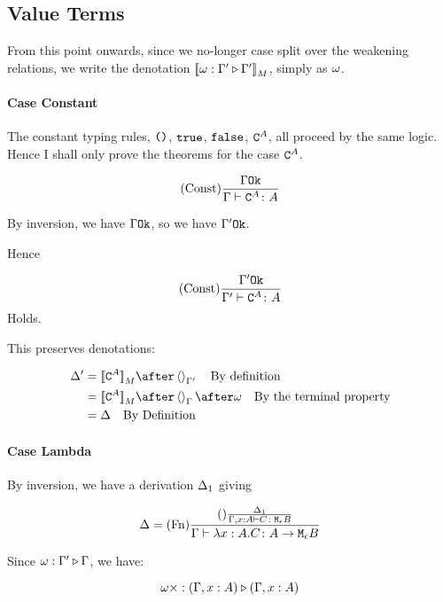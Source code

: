 \documentclass{report}
\begin{document}
    \subsection{Value Terms}
    From this point onwards, since we no-longer case split over the weakening relations, we write the denotation ${\bf [\![}\omega : \Gamma' \triangleright \Gamma'{\bf ]\!]}_M$, simply as $\omega$.


    \paragraph{Case Constant}
    The constant typing rules, $\texttt{()}$, $\texttt{true}$, $\texttt{false}$, $\texttt{C}^{A}$, all proceed by the same logic. Hence I shall only prove the theorems for the case $\texttt{C}^{A}$.

    \begin{equation}
        (\text{Const}) \frac{\Gamma \texttt{Ok}}{\Gamma \vdash \texttt{C}^{A} \colon A}
    \end{equation}

    By inversion, we have $\Gamma \texttt{Ok}$, so we have $\Gamma' \texttt{Ok}$.

    Hence

    \begin{equation}
        (\text{Const}) \frac{\Gamma' \texttt{Ok}}{\Gamma' \vdash \texttt{C}^{A} \colon A}
    \end{equation}
    Holds.

    This preserves denotations:


    \begin{align}
        \D' & = \deno{\const{A}} \after \term{\G'}\qt{By definition}\\
        & = \deno{\const{A}} \after \term{\G}\after \w \qt{By the terminal property}\\
        & = \D\qt{By Definition}\\
    \end{align}


    \paragraph{Case Lambda}
    By inversion, we have a derivation $\Delta_1$ giving

    \begin{equation}
        \Delta = (\text{Fn}) \frac{
            (\text{}) \frac{\Delta_1}{\Gamma, x: A \vdash C \colon \texttt{M}_{\epsilon}{B}}
        }{\Gamma \vdash \lambda x : A. C \colon A \rightarrow \texttt{M}_{\epsilon}{B}}
    \end{equation}

    Since $\omega : \Gamma' \triangleright \Gamma$, we have:

    \begin{equation}
        \omega\times : (\Gamma,x:  A) \triangleright (\Gamma, x: A)
    \end{equation}
\end{document}
